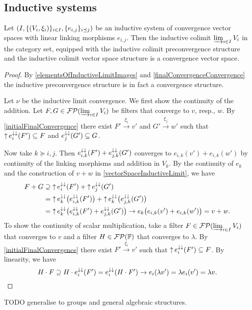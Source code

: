 \subsection{Inductive systems}
\begin{proposition} 
Let $\sSet{I, \{\sSet{V_i, \xi_i}\}_{i\in I}, \{e_{i,j}\}_{i\preceq j}}$ be an inductive system of convergence vector spaces with linear linking morphisms $e_{i,j}$. Then the inductive colimit $\varinjlim_{i\in I} V_i$ in the category set, equipped with the inductive colimit preconvergence structure and the inductive colimit vector space structure is a convergence vector space.
\end{proposition}
\begin{proof}
By \ref{elementsOfInductiveLimitImages} and \ref{finalConvergenceConvergence} the inductive preconvergence structure is in fact a convergence structure.

Let $\nu$ be the inductive limit convergence. We first show the continuity of the addition.
Let $F,G\in \operatorname{\mathcal{FP}}(\varinjlim_{i\in I} V_i)$ be filters that converge to $v$, resp., $w$. By \ref{initialFinalConvergence} there exist $F'\overset{\xi_i}{\longrightarrow} v'$ and $G'\overset{\xi_j}{\longrightarrow} w'$ such that $\operatorname{\uparrow} e_i^{\downarrow\downarrow}(F')\subseteq F$ and $e_j^{\downarrow\downarrow}(G')\subseteq G$.

Now take $k\succeq i,j$. Then $e_{i,k}^{\downarrow\downarrow}(F') + e_{j,k}^{\downarrow\downarrow}(G')$ converges to $e_{i,k}(v')+e_{i,k}(w')$ by continuity of the linking morphisms and addition in $V_k$. By the continuity of $e_k$ and the construction of $v+w$ in \ref{vectorSpaceInductiveLimit}, we have
\begin{align*}
F + G &\supseteq \operatorname{\uparrow} e_i^{\downarrow\downarrow}(F') + \operatorname{\uparrow} e_j^{\downarrow\downarrow}(G') \\
&= \operatorname{\uparrow} e_k^{\downarrow\downarrow}\big(e_{i,k}^{\downarrow\downarrow}(F')\big) + \operatorname{\uparrow} e_k^{\downarrow\downarrow}\big(e_{j,k}^{\downarrow\downarrow}(G')\big) \\
&= \operatorname{\uparrow} e_k^{\downarrow\downarrow}\big(e_{i,k}^{\downarrow\downarrow}(F') + e_{j,k}^{\downarrow\downarrow}(G')\big) \to e_k\big(e_{i,k}(v')+e_{i,k}(w')\big) = v + w.
\end{align*}
To show the continuity of scalar multiplication, take a filter $F\in \operatorname{\mathcal{FP}}(\varinjlim_{i\in I} V_i)$ that converges to $v$ and a filter $H\in \operatorname{\mathcal{FP}}(\mathbb{F})$ that converges to $\lambda$. By \ref{initialFinalConvergence} there exist $F'\overset{\xi_i}{\longrightarrow} v'$ such that $\operatorname{\uparrow} e_i^{\downarrow\downarrow}(F')\subseteq F$. By linearity, we have
\[ H \cdot F \supseteq H\cdot e_i^{\downarrow\downarrow}(F') = e_i^{\downarrow\downarrow}(H\cdot F') \to e_i(\lambda v') = \lambda e_i(v') = \lambda v. \]
\end{proof}
TODO generalise to groups and general algebraic structures.

